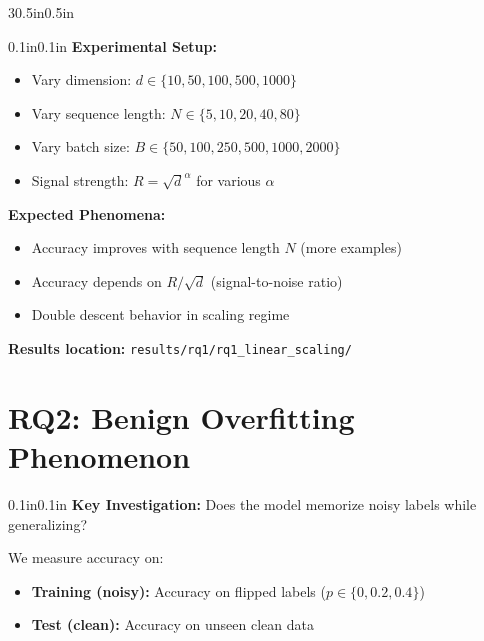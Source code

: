 \documentclass[article,36pt,extrafontsizes,oneside,openany,oldfontcommands]{memoir}
\begin{document}
\begin{adjmulticols*}{3}{0.5in}{0.5in}
\begin{adjustwidth}{0.1in}{0.1in}
\textbf{Experimental Setup:}
\begin{itemize}[topsep=0pt,itemsep=0ex,partopsep=1ex,parsep=1ex]
\item Vary dimension: $d \in \{10, 50, 100, 500, 1000\}$
\item Vary sequence length: $N \in \{5, 10, 20, 40, 80\}$
\item Vary batch size: $B \in \{50, 100, 250, 500, 1000, 2000\}$
\item Signal strength: $R = \sqrt{d}^{\alpha}$ for various $\alpha$
\end{itemize}

\vspace{0.15in}
\textbf{Expected Phenomena:}
\begin{itemize}[topsep=0pt,itemsep=0ex,partopsep=1ex,parsep=1ex]
\item Accuracy improves with sequence length $N$ (more examples)
\item Accuracy depends on $R/\sqrt{d}$ (signal-to-noise ratio)
\item Double descent behavior in scaling regime
\end{itemize}

\textbf{Results location:} \texttt{results/rq1/rq1\_linear\_scaling/}

\end{adjustwidth}

\columnbreak

\begin{minipage}{.65\linewidth}

\section{RQ2: Benign Overfitting Phenomenon}

\begin{adjustwidth}{0.1in}{0.1in}
\textbf{Key Investigation:} Does the model memorize noisy labels while generalizing?

\vspace{0.15in}
We measure accuracy on:
\begin{itemize}[topsep=0pt,itemsep=0ex,partopsep=1ex,parsep=1ex]
\item \textbf{Training (noisy):} Accuracy on flipped labels ($p \in \{0, 0.2, 0.4\}$)
\item \textbf{Test (clean):} Accuracy on unseen clean data
\end{itemize}


\end{adjustwidth}
\end{minipage}
\end{adjmulticols*}
\end{document}
